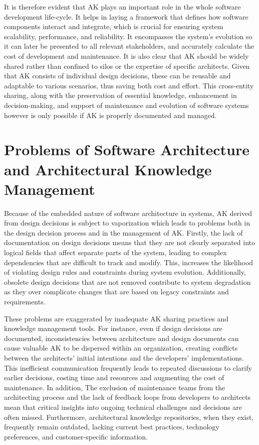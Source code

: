         It is therefore evident that AK plays an important role in the whole software development life-cycle. It helps in laying a framework that defines how software components interact and integrate, which is crucial for ensuring system scalability, performance, and reliability. It encompasses the system's evolution so it can later be presented to all relevant stakeholders, and accurately calculate the cost of development and maintenance. It is also clear that AK should be widely shared rather than confined to silos or the expertise of specific architects. Given that AK consists of individual design decisions, these can be reusable and adaptable to various scenarios, thus saving both cost and effort. This cross-entity sharing, along with the preservation of essential knowledge, enhancement in decision-making, and support of maintenance and evolution of software systems \cite{Architecture-reasoning} however is only possible if AK is properly documented and managed.

    \section{Problems of Software Architecture and Architectural Knowledge Management}
        Because of the embedded nature of software architecture in systems, AK derived from design decisions is subject to vaporization which leads to problems both in the design decision process and in the management of AK. Firstly, the lack of documentation on design decisions means that they are not clearly separated into logical fields that affect separate parts of the system, leading to complex dependencies that are difficult to track and modify. This, increases the likelihood of violating design rules and constraints during system evolution. Additionally, obsolete design decisions that are not removed contribute to system degradation as they over complicate changes that are based on legacy constraints and requirements.\cite{Arch+DesignDescisions}
        
        These problems are exaggerated by inadequate AK sharing practices and knowledge management tools. For instance, even if design decisions are documented, inconsistencies between architecture and design documents can cause valuable AK to be dispersed within an organization, creating conflicts between the architects' initial intentions and the developers' implementations. This inefficient communication frequently leads to repeated discussions to clarify earlier decisions, costing time and resources and augmenting the cost of maintenance. In addition, The exclusion of maintenance teams from the architecting process and the lack of feedback loops from developers to architects mean that critical insights into ongoing technical challenges and decisions are often missed. Furthermore, architectural knowledge repositories, when they exist, frequently remain outdated, lacking current best practices, technology preferences, and customer-specific information. \cite{ARCHITECTURAL_KNOWLEDGE_SHARING_(AKS)}
        

